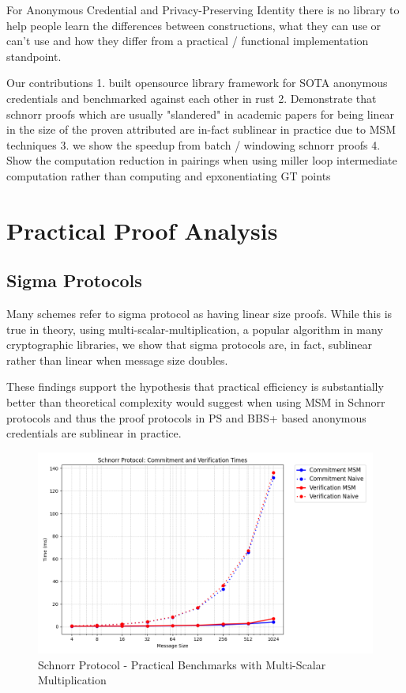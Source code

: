 For Anonymous Credential and Privacy-Preserving Identity there is no library to help people learn the differences between constructions, what they can use or can't use and how they differ from a practical / functional implementation standpoint. 

Our contributions
1. built opensource library framework for SOTA anonymous credentials and benchmarked against each other in rust
2. Demonstrate that schnorr proofs which are usually "slandered" in academic papers for being linear in the size of the proven attributed are in-fact sublinear in practice due to MSM techniques
3. we show the speedup from batch / windowing schnorr proofs 
4. Show the computation reduction in pairings when using miller loop intermediate computation rather than computing and epxonentiating GT points



\section{Practical Proof Analysis}
\subsection{Sigma Protocols}\label{sigma-protocol-analysis}
Many schemes refer to sigma protocol as having linear size proofs. 
While this is true in theory, using multi-scalar-multiplication, a popular algorithm in many cryptographic libraries, we show that sigma protocols are, in fact, sublinear rather than linear when message size doubles.

These findings support the hypothesis that practical efficiency is substantially better than theoretical complexity would suggest when using MSM in Schnorr protocols and thus the proof protocols in PS and BBS+ based anonymous credentials are sublinear in practice.

\begin{figure}
    \centering
    \includegraphics[width=0.75\linewidth]{schnorr_msm_no_msm.png}
    \caption{Schnorr Protocol - Practical Benchmarks with Multi-Scalar Multiplication}
    \label{fig:schnorr-benchmarks}
\end{figure}




